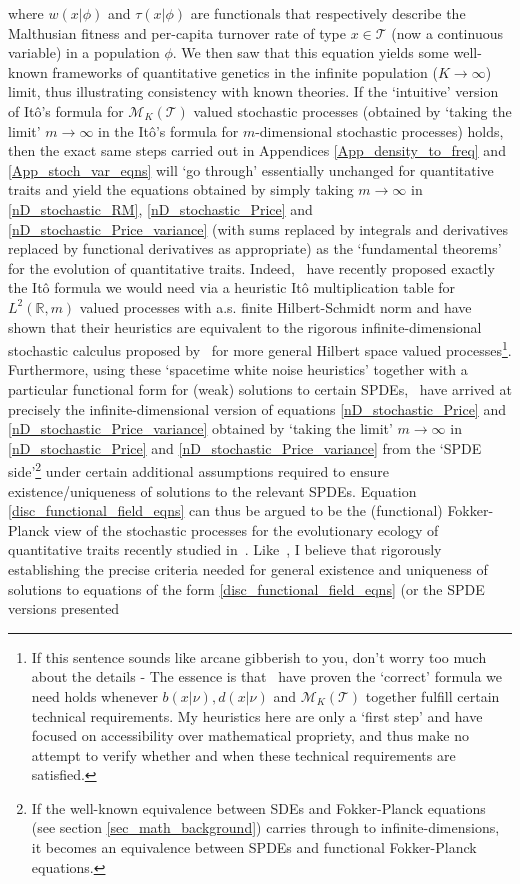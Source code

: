 where $w(x|\phi)$ and $\tau(x|\phi)$ are functionals that respectively describe the Malthusian fitness and per-capita turnover rate of type $x \in \mathcal{T}$ (now a continuous variable) in a population $\phi$. We then saw that this equation yields some well-known frameworks of quantitative genetics in the infinite population ($K \to \infty$) limit, thus illustrating consistency with known theories. If the `intuitive' version of It\^{o}'s formula for $\mathcal{M}_K(\mathcal{T})$ valued stochastic processes (obtained by `taking the limit' $m \to \infty$ in the It\^{o}'s formula for $m$-dimensional stochastic processes) holds, then the exact same steps carried out in Appendices \ref{App_density_to_freq} and \ref{App_stoch_var_eqns} will `go through' essentially unchanged for quantitative traits and yield the equations obtained by simply taking $m \to \infty$ in \eqref{nD_stochastic_RM}, \eqref{nD_stochastic_Price} and \eqref{nD_stochastic_Price_variance} (with sums replaced by integrals and derivatives replaced by functional derivatives as appropriate) as the `fundamental theorems' for the evolution of quantitative traits. Indeed,~\cite{week_white_2021} have recently proposed exactly the It\^o formula we would need via a heuristic It\^o multiplication table for $L^2(\mathbb{R}, m)$ valued processes with a.s. finite Hilbert-Schmidt norm and have shown that their heuristics are equivalent to the rigorous infinite-dimensional stochastic calculus proposed by~\cite{da_prato_stochastic_2014} for more general Hilbert space valued processes\footnote{If this sentence sounds like arcane gibberish to you, don't worry too much about the details - The essence is that~\cite{week_white_2021} have proven the `correct' formula we need holds whenever $b(x|\nu), d(x|\nu)$ and $\mathcal{M}_K(\mathcal{T})$ together fulfill certain technical requirements. My heuristics here are only a `first step' and have focused on accessibility over mathematical propriety, and thus make no attempt to verify whether and when these technical requirements are satisfied.}. Furthermore, using these `spacetime white noise heuristics' together with a particular functional form for (weak) solutions to certain SPDEs,~\cite{week_white_2021} have arrived at precisely the infinite-dimensional version of equations \eqref{nD_stochastic_Price} and \eqref{nD_stochastic_Price_variance} obtained by `taking the limit' $m \to \infty$ in \eqref{nD_stochastic_Price} and \eqref{nD_stochastic_Price_variance} from the `SPDE side'\footnote{If the well-known equivalence between SDEs and Fokker-Planck equations (see section \ref{sec_math_background}) carries through to infinite-dimensions, it becomes an equivalence between SPDEs and functional Fokker-Planck equations.} under certain additional assumptions required to ensure existence/uniqueness of solutions to the relevant SPDEs. Equation \eqref{disc_functional_field_eqns} can thus be argued to be the (functional) Fokker-Planck view of the stochastic processes for the evolutionary ecology of quantitative traits recently studied in~\cite{week_white_2021}. Like~\cite{week_white_2021}, I believe that rigorously establishing the precise criteria needed for general existence and uniqueness of solutions to equations of the form \eqref{disc_functional_field_eqns} (or the SPDE versions presented 